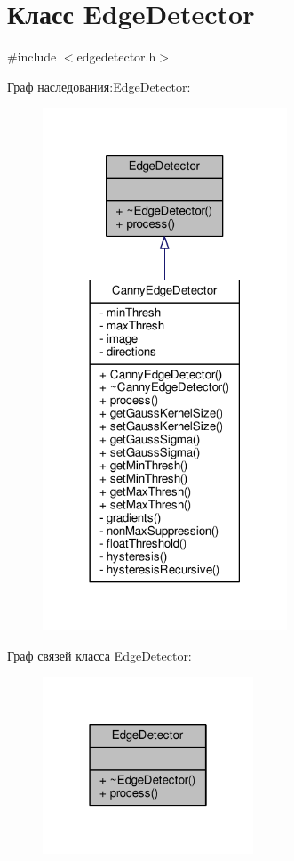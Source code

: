 \hypertarget{class_edge_detector}{}\section{Класс Edge\+Detector}
\label{class_edge_detector}


{\ttfamily \#include $<$edgedetector.\+h$>$}



Граф наследования\+:Edge\+Detector\+:
\nopagebreak
\begin{figure}[H]
\begin{center}
\leavevmode
\includegraphics[width=206pt]{db/d47/class_edge_detector__inherit__graph}
\end{center}
\end{figure}


Граф связей класса Edge\+Detector\+:
\nopagebreak
\begin{figure}[H]
\begin{center}
\leavevmode
\includegraphics[width=178pt]{d3/dbb/class_edge_detector__coll__graph}
\end{center}
\end{figure}

